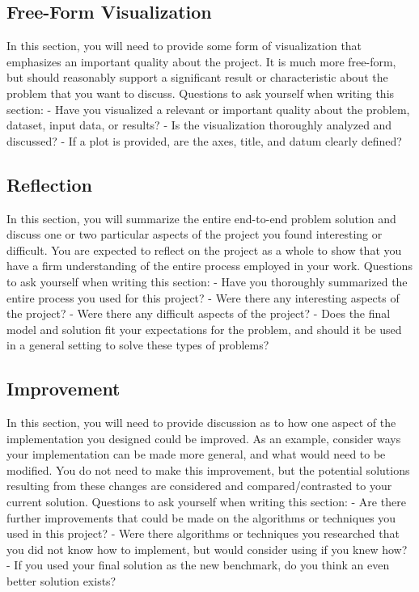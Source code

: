 \documentclass[12pt]{article}
\begin{document}
\subsection{Free-Form Visualization}
In this section, you will need to provide some form of visualization that emphasizes an important quality about the project. It is much more free-form, but should reasonably support a significant result or characteristic about the problem that you want to discuss. Questions to ask yourself when writing this section:
- Have you visualized a relevant or important quality about the problem, dataset, input data, or results?
- Is the visualization thoroughly analyzed and discussed?
- If a plot is provided, are the axes, title, and datum clearly defined?

\subsection{Reflection}
In this section, you will summarize the entire end-to-end problem solution and discuss one or two particular aspects of the project you found interesting or difficult. You are expected to reflect on the project as a whole to show that you have a firm understanding of the entire process employed in your work. Questions to ask yourself when writing this section:
- Have you thoroughly summarized the entire process you used for this project?
- Were there any interesting aspects of the project?
- Were there any difficult aspects of the project?
- Does the final model and solution fit your expectations for the problem, and should it be used in a general setting to solve these types of problems?

\subsection{Improvement}
In this section, you will need to provide discussion as to how one aspect of the implementation you designed could be improved. As an example, consider ways your implementation can be made more general, and what would need to be modified. You do not need to make this improvement, but the potential solutions resulting from these changes are considered and compared/contrasted to your current solution. Questions to ask yourself when writing this section:
- Are there further improvements that could be made on the algorithms or techniques you used in this project?
- Were there algorithms or techniques you researched that you did not know how to implement, but would consider using if you knew how?
- If you used your final solution as the new benchmark, do you think an even better solution exists?
\end{document}
